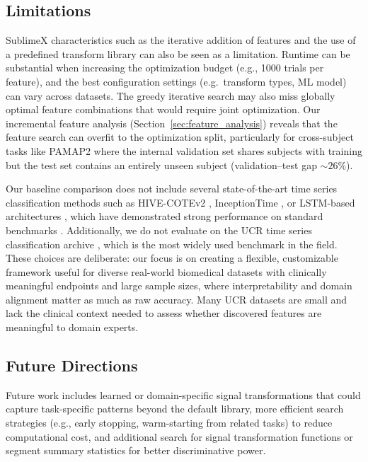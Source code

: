 \documentclass[times, review, 10pt]{elsarticle}
\begin{document}
\subsection{Limitations}

SublimeX characteristics such as the iterative addition of features and the use of a predefined transform library can also be seen as a limitation. Runtime can
be substantial when increasing the optimization budget (e.g., 1000 trials per feature), and the best configuration settings (e.g.\ transform types, ML model)
can vary across datasets. The greedy iterative search may also miss globally optimal feature combinations that would require joint optimization. Our
incremental feature analysis (Section~\ref{sec:feature_analysis})
reveals that the feature search can overfit to the optimization
split, particularly for cross-subject tasks like PAMAP2 where the
internal validation set shares subjects with training but the test
set contains an entirely unseen subject
(validation--test gap ${\sim}26\%$).

Our baseline comparison does not include several state-of-the-art time series classification methods such as HIVE-COTEv2
\cite{middlehurst2021hivecote2}, InceptionTime \cite{fawaz2020inceptiontime}, or LSTM-based architectures \cite{ordonez2016deep_activity}, which have demonstrated strong performance on
standard benchmarks \cite{middlehurst2024bakeoff}. Additionally, we do not
evaluate on the UCR time series classification archive \cite{dau2019ucr}, which is the most widely used benchmark in the field. These choices are deliberate: 
our focus is on creating a flexible, customizable framework useful for diverse real-world biomedical datasets with clinically meaningful endpoints and large sample sizes, 
where interpretability and domain alignment matter as much as raw accuracy.
Many UCR datasets are small and lack the clinical context needed to assess whether discovered features are meaningful to domain experts.

\subsection{Future Directions}

Future work includes learned or domain-specific signal transformations that could capture task-specific patterns beyond the default library, more efficient
search strategies (e.g., early stopping, warm-starting from related tasks) to reduce computational cost, and additional search for signal transformation functions 
or segment summary statistics for better discriminative power.
\end{document}
